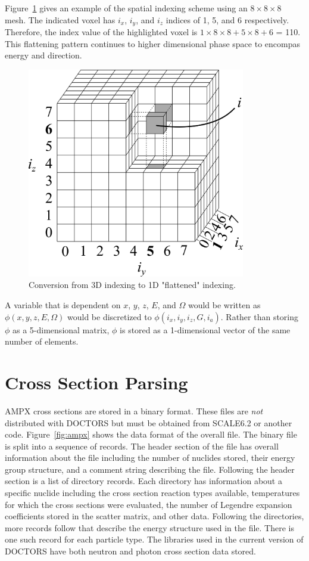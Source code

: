 Figure~\ref{fig:indx_ex} gives an example of the spatial indexing scheme using an $8 \times 8 \times 8$ mesh. The indicated voxel has $i_x$, $i_y$, and $i_z$ indices of 1, 5, and 6 respectively. Therefore, the index value of the highlighted voxel is $1 \times 8 \times 8 + 5 \times 8 + 6$ = 110. This flattening pattern continues to higher dimensional phase space to encompas energy and direction.

\begin{figure}[tb]
  \begin{center}
   \includegraphics[width=3.75in]{figs/indx_ex}
  \end{center}
  \caption{Conversion from 3D indexing to 1D "flattened" indexing.}
\label{fig:indx_ex}
\end{figure}

A variable that is dependent on $x$, $y$, $z$, $E$, and $\Omega$ would be written as $\phi(x, y, z, E, \Omega)$ would be discretized to $\phi(i_x, i_y, i_z, G, i_a)$. Rather than storing $\phi$ as a 5-dimensional matrix, $\phi$ is stored as a 1-dimensional vector of the same number of elements.

\section{Cross Section Parsing}\label{sec:xsparse}
AMPX cross sections are stored in a binary format. These files are \textit{not} distributed with DOCTORS but must be obtained from SCALE6.2 or another code. Figure~\ref{fig:ampx} shows the data format of the overall file. The binary file is split into a sequence of records. The header section of the file has overall information about the file including the number of nuclides stored, their energy group structure, and a comment string describing the file. Following the header section is a list of directory records. Each directory has information about a specific nuclide including the cross section reaction types available, temperatures for which the cross sections were evaluated, the number of Legendre expansion coefficients stored in the scatter matrix, and other data. Following the directories, more records follow that describe the energy structure used in the file. There is one such record for each particle type. The libraries used in the current version of DOCTORS have both neutron and photon cross section data stored.

